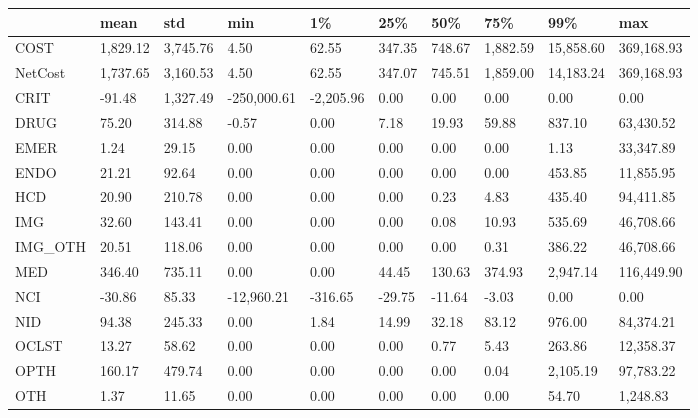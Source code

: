 \begin{tabular}{llllllllll}
\toprule
{} &      mean &       std &          min &         1\% &     25\% &     50\% &       75\% &        99\% &         max \\
\midrule
COST     &  1,829.12 &  3,745.76 &         4.50 &      62.55 &  347.35 &  748.67 &  1,882.59 &  15,858.60 &  369,168.93 \\
NetCost  &  1,737.65 &  3,160.53 &         4.50 &      62.55 &  347.07 &  745.51 &  1,859.00 &  14,183.24 &  369,168.93 \\
CRIT     &    -91.48 &  1,327.49 &  -250,000.61 &  -2,205.96 &    0.00 &    0.00 &      0.00 &       0.00 &        0.00 \\
DRUG     &     75.20 &    314.88 &        -0.57 &       0.00 &    7.18 &   19.93 &     59.88 &     837.10 &   63,430.52 \\
EMER     &      1.24 &     29.15 &         0.00 &       0.00 &    0.00 &    0.00 &      0.00 &       1.13 &   33,347.89 \\
ENDO     &     21.21 &     92.64 &         0.00 &       0.00 &    0.00 &    0.00 &      0.00 &     453.85 &   11,855.95 \\
HCD      &     20.90 &    210.78 &         0.00 &       0.00 &    0.00 &    0.23 &      4.83 &     435.40 &   94,411.85 \\
IMG      &     32.60 &    143.41 &         0.00 &       0.00 &    0.00 &    0.08 &     10.93 &     535.69 &   46,708.66 \\
IMG\_OTH  &     20.51 &    118.06 &         0.00 &       0.00 &    0.00 &    0.00 &      0.31 &     386.22 &   46,708.66 \\
MED      &    346.40 &    735.11 &         0.00 &       0.00 &   44.45 &  130.63 &    374.93 &   2,947.14 &  116,449.90 \\
NCI      &    -30.86 &     85.33 &   -12,960.21 &    -316.65 &  -29.75 &  -11.64 &     -3.03 &       0.00 &        0.00 \\
NID      &     94.38 &    245.33 &         0.00 &       1.84 &   14.99 &   32.18 &     83.12 &     976.00 &   84,374.21 \\
OCLST    &     13.27 &     58.62 &         0.00 &       0.00 &    0.00 &    0.77 &      5.43 &     263.86 &   12,358.37 \\
OPTH     &    160.17 &    479.74 &         0.00 &       0.00 &    0.00 &    0.00 &      0.04 &   2,105.19 &   97,783.22 \\
OTH      &      1.37 &     11.65 &         0.00 &       0.00 &    0.00 &    0.00 &      0.00 &      54.70 &    1,248.83 \\

\end{tabular}
